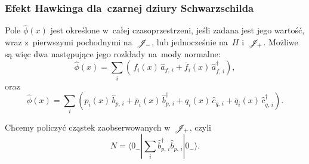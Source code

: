 \documentclass[10pt,t]{beamer}
\begin{document}
\begin{frame}
  \frametitle{Efekt Hawkinga dla~czarnej dziury Schwarzschilda}


  Pole $\widehat{ \phi }( x )$ jest określone w~całej czasoprzestrzeni,
  jeśli zadana jest jego wartość, wraz z~pierwszymi pochodnymi
  na~$\mathcal{J}_{ - }$, lub jednocześnie na~$H$ i~$\mathcal{J}_{ + }$. Możliwe są
  więc dwa następujące jego rozkłady na~mody normalne:
  \begin{equation}
    \label{eq:Promieniowanie-Hawkinga-39}
    \widehat{ \phi }( x )
    = \sum_{ i } ( \, f_{ i }( x ) \, \widehat{ a }_{ f,\, i }
    + \bar{ f }_{ i }( x ) \, \widehat{ a }^{ \dagger }_{ f,\, i } ),
  \end{equation}
  oraz
  \begin{equation}
    \label{eq:Promieniowanie-Hawkinga-40}
    \widehat{ \phi }( x ) =
    \sum_{ i }( p_{ i }( x ) \, \widehat{ b }_{ p,\, i }
    + \bar{ p }_{ i }( x ) \, \widehat{ b }^{ \dagger }_{ p,\, i }
    + q_{ i }( x )\, \widehat{ c }_{ q,\, i }
    + \bar{ q }_{ i }( x ) \, \widehat{ c }^{ \dagger }_{ q,\, i } ).
  \end{equation}

  Chcemy policzyć cząstek zaobserwowanych w~$\mathcal{J}_{ + }$, czyli
  \begin{equation}
    \label{eq:Promieniowanie-Hawkinga-41}
    N =
    \langle 0_{ - } | \sum_{ i } \widehat{ b }^{ \dagger }_{ p,\, i }
    \widehat{ b }_{ p,\, i } | 0_{ - } \rangle.
  \end{equation}

\end{frame}
\end{document}
